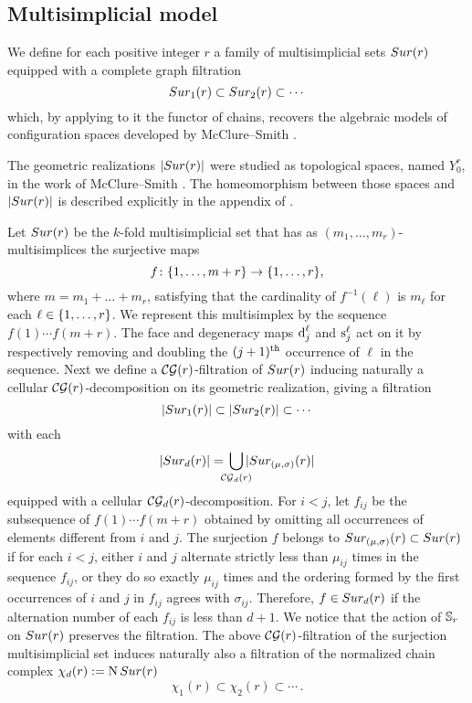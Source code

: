 \subsection{Multisimplicial model}\label{ss:surjection model}

We define for each positive integer $r$ a family of multisimplicial sets $Sur(r)$ equipped with a complete graph filtration
\[
 Sur_{1}(r) \subset Sur_{2}(r) \subset \dotsb
\]
which, by applying to it the functor of chains, recovers the algebraic models of configuration spaces developed by McClure--Smith \cite{mcluresmith2004geomodel}.

The geometric realizations $\lvert Sur(r)\rvert$ were studied as topological spaces, named $Y^{r}_{0}$, in the work of McClure--Smith \cite{mcclure2003multivariable}. The homeomorphism between those spaces and $\lvert Sur(r)\rvert$ is described explicitly in the appendix of \cite{salvatore2009deligne}. 


Let $Sur(r)$ be the $k$-fold multisimplicial set that has as $(m_1,\dots,m_r)$-multisimplices
the surjective maps
\[
f \colon \{1,\dots,m+r\} \to \{1,\dots,r\},
\]
where $m = m_1+\dots+m_r$, satisfying that the cardinality of $f^{-1}(\ell)$ is $m_\ell$ for each $\ell \in \{1,\dots,r\}$.
We represent this multisimplex by the sequence $f(1) \dotsm f(m+r)$.
The face and degeneracy maps $\operatorname{d}^\ell_j$ and $\operatorname{s}^\ell_j$ act on it by respectively removing and doubling the $(j+1)^{\mathrm{th}}$ occurrence of $\ell$ in the sequence.
Next we define a $\mathcal{CG}(r)$-filtration of $Sur(r)$ inducing naturally a cellular $\mathcal{CG}(r)$-decomposition on its geometric realization, giving a filtration
\[
\lvert Sur_1(r)\rvert \subset \lvert Sur_2(r)\rvert \subset \dotsb
\]
with each
\[
\bars{\sur_d(r)} = \, \bigcup_{\mathclap{\CG_d(r)}} \, \bars{\sur_{(\mu,\sigma)}(r)}
\]
equipped with a cellular $\mathcal{CG}_d(r)$-decomposition.
For $i<j$, let $f_{ij}$ be the subsequence of $f(1) \dotsm f(m+r)$ obtained by omitting all occurrences of elements different from $i$ and $j$.
The surjection $f$ belongs to $Sur_{(\mu,\sigma)}(r) \subset Sur(r)$ if for each $i<j$, either $i$ and $j$ alternate strictly less than $\mu_{ij}$ times in the sequence $f_{ij}$, or they do so exactly $\mu_{ij}$ times and the ordering formed by the first occurrences of $i$ and $j$ in $f_{ij}$ agrees with $\sigma_{ij}$.
Therefore, $f \in Sur_{d}(r)$ if the alternation number of each $f_{ij}$ is less than $d+1$.
We notice that
the action of $\mathbb{S}_r$ on $Sur(r)$ preserves the filtration. The above $\mathcal{CG}(r)$-filtration of the surjection multisimplicial set induces naturally also a filtration of the normalized chain complex $\chi_d(r):=\operatorname{N} Sur(r)$
\[
\chi_1(r) \subset \chi_2(r) \subset \dotsb \,.
\]

